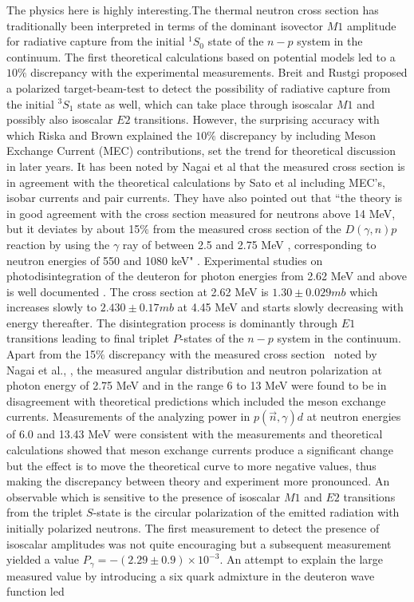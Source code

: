 The physics here is highly interesting.The thermal neutron cross section \cite{chap34-key22} has traditionally been interpreted in terms of the dominant isovector $M1$ amplitude for radiative capture from the initial $^1S_0$ state of the $n-p$ system in the continuum. The first theoretical calculations \cite{chap34-key23} based on potential models led to a $10\%$ discrepancy with the experimental measurements. Breit and Rustgi \cite{chap34-key24} proposed a polarized target-beam-test to detect the possibility of radiative capture from the initial $^3S_1$ state as well, which can take place through isoscalar $M1$ and possibly also isoscalar $E2$ transitions. However, the surprising accuracy with which Riska and Brown \cite{chap34-key25} explained the $10\%$ discrepancy by including Meson Exchange Current (MEC) contributions, set the trend for theoretical discussion in later years. It has been noted by Nagai et al \cite{chap34-key21} that the measured cross section is in agreement with the theoretical calculations by Sato et al \cite{chap34-key26} including MEC's, isobar currents and pair currents. They have also pointed out that ``the theory is in good agreement with the cross section measured for neutrons above 14 MeV, but it deviates by about 15$\%$ from the measured cross section of the $D(\gamma,n)p$ reaction by using the $\gamma$ ray of between 2.5 and 2.75 MeV \cite{chap34-key27}, corresponding to neutron energies of 550 and 1080 keV" \cite{chap34-key21}. Experimental studies on photodisintegration of the deuteron for photon energies from 2.62 MeV and above is well documented  \cite{chap34-key28}. The cross section at 2.62 MeV is $1.30\pm 0.029 mb$ which increases slowly to $2.430 \pm 0.17 mb$ at 4.45 MeV and starts slowly decreasing with energy thereafter. The disintegration process is dominantly through $E1$ transitions leading to final triplet $P$-states of the $n-p$ system in the continuum. Apart from the 15$\%$ discrepancy with the measured cross section~\cite{chap34-key27} noted by Nagai et al., \cite{chap34-key21}, the measured angular distribution and neutron polarization at photon energy of 2.75 MeV \cite{chap34-key29} and in the range 6 to 13 MeV \cite{chap34-key30} were found to be in disagreement with theoretical predictions which included the meson exchange currents. Measurements of the analyzing power \cite{chap34-key31} in $p(\vec n, \gamma)d$ at neutron energies of 6.0 and 13.43 MeV were consistent with the measurements \cite{chap34-key30} and theoretical calculations \cite{chap34-key32} showed that meson exchange currents produce a significant change but the effect is to move the theoretical curve to more negative values, thus making the discrepancy between theory and experiment more pronounced. An observable which is sensitive to the presence of isoscalar $M1$ and $E2$ transitions from the triplet $S$-state is the circular polarization of the emitted radiation with initially polarized neutrons. The first measurement \cite{chap34-key33} to detect the presence of isoscalar amplitudes was not quite encouraging but a subsequent measurement \cite{chap34-key34} yielded a value $P_\gamma= -(2.29 \pm 0.9)\times 10^{-3}$. An attempt \cite{chap34-key35} to explain the large measured value by introducing a six quark admixture in the deuteron wave function led 